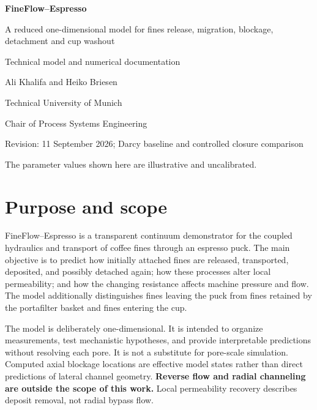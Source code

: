 \documentclass[11pt,a4paper]{article}
\begin{document}
\begin{titlepage}
\centering
\vspace*{2.2cm}
{\Huge\bfseries\color{titleblue} FineFlow--Espresso\par}
\vspace{0.5cm}
{\LARGE A reduced one-dimensional model for fines release, migration,
blockage, detachment and cup washout\par}
\vspace{1.0cm}
{\Large Technical model and numerical documentation\par}
\vfill
{\large Ali Khalifa and Heiko Briesen\par}
\vspace{0.2cm}
{\normalsize Technical University of Munich\par
Chair of Process Systems Engineering\par}
\vfill
{\normalsize Revision: 11 September 2026; Darcy baseline and controlled closure comparison\par}
\vspace{0.3cm}
{\small The parameter values shown here are illustrative and uncalibrated.\par}
\end{titlepage}

{\small\setlength{\parskip}{0pt}\tableofcontents}
\newpage
{}

\section{Purpose and scope}

FineFlow--Espresso is a transparent continuum demonstrator for the coupled
hydraulics and transport of coffee fines through an espresso puck. The main
objective is to predict how initially attached fines are released, transported,
deposited, and possibly detached again; how these processes alter local
permeability; and how the changing resistance affects machine pressure and flow.
The model additionally distinguishes fines leaving the puck from fines retained
by the portafilter basket and fines entering the cup.

The model is deliberately one-dimensional. It is intended to organize
measurements, test mechanistic hypotheses, and provide interpretable predictions
without resolving each pore. It is not a substitute for pore-scale simulation.
Computed axial blockage locations are effective model states rather than direct
predictions of lateral channel geometry.
\textbf{Reverse flow and radial channeling are outside the scope of this work.}
Local permeability recovery describes deposit removal, not radial bypass flow.
\end{document}
